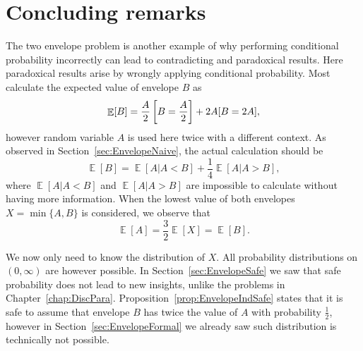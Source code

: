 \documentclass[a4paper]{report}
\theoremstyle{plain}
\theoremstyle{definition}
\theoremstyle{remark}
\numberwithin{equation}{chapter}
\let\P\relax
\DeclareMathOperator{\P}{\mathbb{P}}
\DeclareMathOperator{\E}{\mathbb{E}}
\DeclareMathOperator{\1}{\mathbbm{1}}
\begin{document}
\section{Concluding remarks}\label{sec:EnvelopeConcl}
The two envelope problem is another example of why performing conditional probability incorrectly can lead to contradicting and paradoxical results. Here paradoxical results arise by wrongly applying conditional probability. Most calculate the expected value of envelope $B$ as
\begin{equation}
\E[B]=\frac{A}{2}\P\left[B=\frac{A}{2}\right]+2A\P[B=2A],
\end{equation}
however random variable $A$ is used here twice with a different context. As observed in Section~\ref{sec:EnvelopeNaive}, the actual calculation should be
\begin{equation}
\E[B]=\E[A|A<B]+\frac{1}{4}\E[A|A>B],
\end{equation}
where $\E[A|A<B]$ and $\E[A|A>B]$ are impossible to calculate without having more information. When the lowest value of both envelopes $X=\min\{A,B\}$ is considered, we observe that
\begin{equation}
\E[A]=\frac{3}{2}\E[X]=\E[B].
\end{equation}

We now only need to know the distribution of $X$. All probability distributions on $(0,\infty)$ are however possible. In Section~\ref{sec:EnvelopeSafe} we saw that safe probability does not lead to new insights, unlike the problems in Chapter~\ref{chap:DiscPara}. Proposition~\ref{prop:EnvelopeIndSafe} states that it is safe to assume that envelope $B$ has twice the value of $A$ with probability $\frac{1}{2}$, however in Section~\ref{sec:EnvelopeFormal} we already saw such distribution is technically not possible.
\end{document}
